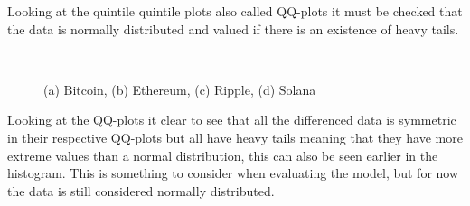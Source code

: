 Looking at the quintile quintile plots also called QQ-plots it must be checked that the data is normally distributed and valued if there is an existence of heavy tails.
\begin{figure}[H]
  \centering
  \quad
  \\
  \quad
  \caption{(a) Bitcoin, (b) Ethereum, (c) Ripple, (d) Solana }
\end{figure}
Looking at the QQ-plots it clear to see that all the differenced data is symmetric in their respective QQ-plots but all have heavy tails meaning that they have more extreme values than a normal distribution, this can also be seen earlier in the histogram. This is something to consider when evaluating the model, but for now the data is still considered normally distributed.